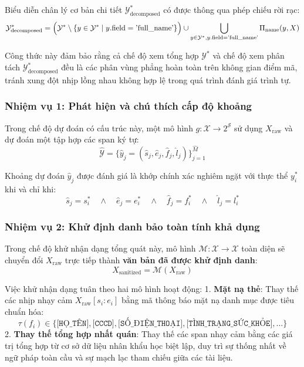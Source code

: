 \documentclass[
  11pt,
  a4paper,
]{article}
\begin{document}
Biểu diễn chân lý cơ bản chi tiết \(\mathcal{Y}^*_{\text{decomposed}}\)
có được thông qua phép chiếu rời rạc:
\[\mathcal{Y}^*_{\text{decomposed}} = \Bigl(\mathcal{Y}^* \setminus \{y \in \mathcal{Y}^* \mid y.\text{field} = \text{'full\_name'}\}\Bigr) \cup \bigcup_{y \in \mathcal{Y}^*, y.\text{field} = \text{'full\_name'}} \Pi_{\text{name}}(y, X)\]

Công thức này đảm bảo rằng cả chế độ xem tổng hợp \(\mathcal{Y}^*\) và
chế độ xem phân tách \(\mathcal{Y}^*_{\text{decomposed}}\) đều là các
phân vùng phẳng hoàn toàn trên không gian điểm mã, tránh xung đột nhịp
lồng nhau không hợp lệ trong quá trình đánh giá trình tự.

\subsubsection{Nhiệm vụ 1: Phát hiện và chú thích cấp độ
khoảng}\label{nhiux1ec7m-vux1ee5-1-phuxe1t-hiux1ec7n-vuxe0-chuxfa-thuxedch-cux1ea5p-ux111ux1ed9-khoux1ea3ng}

Trong chế độ dự đoán có cấu trúc này, một mô hình
\(g: \mathcal{X} \to 2^{\mathcal{S}}\) sử dụng \(X_{\text{raw}}\) và dự
đoán một tập hợp các span ký tự:
\[\hat{\mathcal{Y}} = \bigl\{\hat{y}_j = (\hat{s}_j, \hat{e}_j, \hat{f}_j, \hat{l}_j)\bigr\}_{j=1}^{\hat{M}}\]

Khoảng dự đoán \(\hat{y}_j\) được đánh giá là khớp chính xác nghiêm ngặt
với thực thể \(y_i^*\) khi và chỉ khi:
\[\hat{s}_j = s_i^* \quad \land \quad \hat{e}_j = e_i^* \quad \land \quad \hat{f}_j = f_i^* \quad \land \quad \hat{l}_j = l_i^*\]

\subsubsection{Nhiệm vụ 2: Khử định danh bảo toàn tính khả
dụng}\label{nhiux1ec7m-vux1ee5-2-khux1eed-ux111ux1ecbnh-danh-bux1ea3o-touxe0n-tuxednh-khux1ea3-dux1ee5ng}

Trong chế độ khử nhận dạng tổng quát này, mô hình
\(\mathcal{M}: \mathcal{X} \to \mathcal{X}\) toàn diện sẽ chuyển đổi
\(X_{\text{raw}}\) trực tiếp thành \textbf{văn bản đã được khử định
danh}: \[X_{\text{sanitized}} = \mathcal{M}(X_{\text{raw}})\]

Việc khử nhận dạng tuân theo hai mô hình hoạt động: 1. \textbf{Mặt nạ
thẻ}: Thay thế các nhịp nhạy cảm \(X_{\text{raw}}[s_i:e_i]\) bằng mã
thông báo mặt nạ danh mục được tiêu chuẩn hóa:
\[\tau(f_i) \in \bigl\{\texttt{[HỌ\_TÊN]}, \texttt{[CCCD]}, \texttt{[SỐ\_ĐIỆN\_THOẠI]}, \texttt{[TÌNH\_TRẠNG\_SỨC\_KHỎE]}, \dots\bigr\}\]
2. \textbf{Thay thế tổng hợp nhất quán}: Thay thế các span nhạy cảm bằng
các giá trị tổng hợp từ cơ sở dữ liệu nhân khẩu học biệt lập, duy trì sự
thống nhất về ngữ pháp toàn cầu và sự mạch lạc tham chiếu giữa các tài
liệu.
\end{document}
